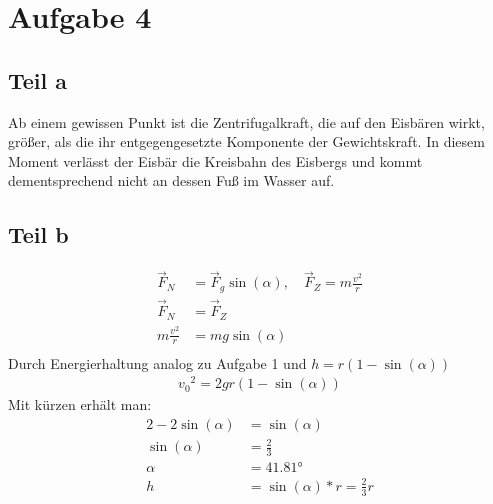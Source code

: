 \documentclass[a4paper,10pt]{extarticle}
\begin{document}
  \section*{Aufgabe 4}
  \subsection*{Teil a}
  Ab einem gewissen Punkt ist die Zentrifugalkraft, die auf den Eisbären wirkt, größer, als die ihr entgegengesetzte Komponente der Gewichtskraft. In diesem Moment verlässt der Eisbär die Kreisbahn des Eisbergs und kommt dementsprechend nicht an dessen Fuß im Wasser auf.  
  \subsection*{Teil b}
  \begin{align*}
  \vec{F}_N &= \vec{F}_g \sin(\alpha), \quad \vec{F}_Z = m\frac{v^2}{r} \\
  \vec{F}_N &= \vec{F}_Z \\
  m\frac{v^2}{r} &= mg \sin(\alpha) \\
  \end{align*}
  Durch Energierhaltung analog zu Aufgabe 1 und $h = r(1-\sin(\alpha))$
  \begin{align*}
  {v_0}^2 = 2gr(1-\sin(\alpha))
  \end{align*}
  Mit kürzen erhält man: \\
  \begin{align*}
  2-2\sin(\alpha) &= \sin(\alpha) \\
  \sin(\alpha) &= \frac{2}{3} \\
  \alpha &= \ang{41.81} \\
  h &= \sin(\alpha) * r = \frac{2}{3}r
  \end{align*}
\end{document}
